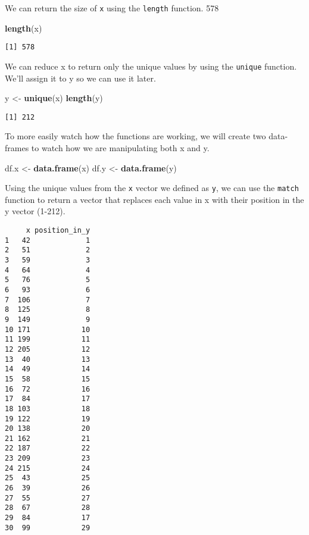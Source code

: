\documentclass[12pt,]{article}
\newenvironment{Shaded}{\begin{snugshade}}{\end{snugshade}}
\newcommand{\KeywordTok}[1]{\textcolor[rgb]{0.13,0.29,0.53}{\textbf{#1}}}
\newcommand{\DataTypeTok}[1]{\textcolor[rgb]{0.13,0.29,0.53}{#1}}
\newcommand{\DecValTok}[1]{\textcolor[rgb]{0.00,0.00,0.81}{#1}}
\newcommand{\StringTok}[1]{\textcolor[rgb]{0.31,0.60,0.02}{#1}}
\newcommand{\OperatorTok}[1]{\textcolor[rgb]{0.81,0.36,0.00}{\textbf{#1}}}
\newcommand{\NormalTok}[1]{#1}
\theoremstyle{definition}
\theoremstyle{definition}
\theoremstyle{definition}
\theoremstyle{remark}
\begin{document}
We can return the size of \texttt{x} using the \texttt{length} function.
578

\begin{Shaded}
\begin{Highlighting}[]
\KeywordTok{length}\NormalTok{(x)}
\end{Highlighting}
\end{Shaded}

\begin{verbatim}
[1] 578
\end{verbatim}

We can reduce x to return only the unique values by using the
\texttt{unique} function. We'll assign it to y so we can use it later.

\begin{Shaded}
\begin{Highlighting}[]
\NormalTok{y <-}\StringTok{ }\KeywordTok{unique}\NormalTok{(x)}
\KeywordTok{length}\NormalTok{(y)}
\end{Highlighting}
\end{Shaded}

\begin{verbatim}
[1] 212
\end{verbatim}

To more easily watch how the functions are working, we will create two
data-frames to watch how we are manipulating both x and y.

\begin{Shaded}
\begin{Highlighting}[]
\NormalTok{df.x <-}\StringTok{ }\KeywordTok{data.frame}\NormalTok{(x)}
\NormalTok{df.y <-}\StringTok{ }\KeywordTok{data.frame}\NormalTok{(y)}
\end{Highlighting}
\end{Shaded}

Using the unique values from the \texttt{x} vector we defined as
\texttt{y}, we can use the \texttt{match} function to return a vector
that replaces each value in x with their position in the y vector
(1-212).

\begin{Shaded}
\end{Shaded}

\begin{verbatim}
     x position_in_y
1   42             1
2   51             2
3   59             3
4   64             4
5   76             5
6   93             6
7  106             7
8  125             8
9  149             9
10 171            10
11 199            11
12 205            12
13  40            13
14  49            14
15  58            15
16  72            16
17  84            17
18 103            18
19 122            19
20 138            20
21 162            21
22 187            22
23 209            23
24 215            24
25  43            25
26  39            26
27  55            27
28  67            28
29  84            17
30  99            29
\end{verbatim}
\end{document}
